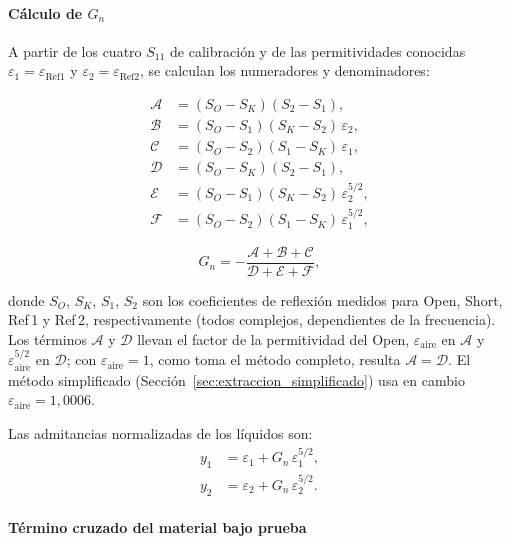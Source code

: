 \paragraph{Cálculo de $G_n$}

A partir de los cuatro $S_{11}$ de calibración y de las permitividades conocidas
$\varepsilon_1 = \varepsilon_{\text{Ref1}}$ y $\varepsilon_2 = \varepsilon_{\text{Ref2}}$,
se calculan los numeradores y denominadores:

\begin{align}
    \mathcal{A} &= (S_O - S_K)(S_2 - S_1), \nonumber \\
    \mathcal{B} &= (S_O - S_1)(S_K - S_2)\,\varepsilon_2, \nonumber \\
    \mathcal{C} &= (S_O - S_2)(S_1 - S_K)\,\varepsilon_1, \nonumber \\[4pt]
    \mathcal{D} &= (S_O - S_K)(S_2 - S_1), \nonumber \\
    \mathcal{E} &= (S_O - S_1)(S_K - S_2)\,\varepsilon_2^{5/2}, \nonumber \\
    \mathcal{F} &= (S_O - S_2)(S_1 - S_K)\,\varepsilon_1^{5/2}, \nonumber
\end{align}

\begin{equation}
    G_n = -\frac{\mathcal{A} + \mathcal{B} + \mathcal{C}}
                {\mathcal{D} + \mathcal{E} + \mathcal{F}},
    \label{eq:gn}
\end{equation}

\noindent donde $S_O$, $S_K$, $S_1$, $S_2$ son los coeficientes de reflexión
medidos para Open, Short, Ref\,1 y Ref\,2, respectivamente (todos complejos,
dependientes de la frecuencia). Los términos $\mathcal{A}$ y $\mathcal{D}$ llevan el
factor de la permitividad del Open, $\varepsilon_{\text{aire}}$ en $\mathcal{A}$ y
$\varepsilon_{\text{aire}}^{5/2}$ en $\mathcal{D}$; con $\varepsilon_{\text{aire}} = 1$,
como toma el método completo, resulta $\mathcal{A} = \mathcal{D}$. El método
simplificado (Sección~\ref{sec:extraccion_simplificado}) usa en cambio
$\varepsilon_{\text{aire}} = 1{,}0006$.

Las admitancias normalizadas de los líquidos son:
\begin{align}
    y_1 &= \varepsilon_1 + G_n\,\varepsilon_1^{5/2}, \label{eq:y1} \\
    y_2 &= \varepsilon_2 + G_n\,\varepsilon_2^{5/2}. \label{eq:y2}
\end{align}

\paragraph{Término cruzado del material bajo prueba}

